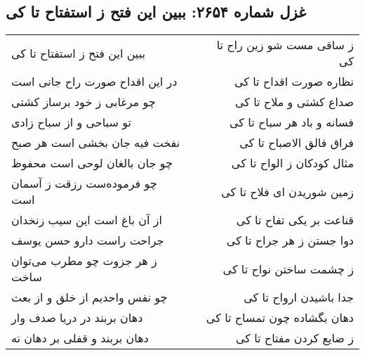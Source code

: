 \begin{center}
\section*{غزل شماره ۲۶۵۴: ببین این فتح ز استفتاح تا کی}
\label{sec:2654}
\begin{longtable}{l p{0.5cm} r}
ببین این فتح ز استفتاح تا کی
&&
ز ساقی مست شو زین راح تا کی
\\
در این اقداح صورت راح جانی است
&&
نظاره صورت اقداح تا کی
\\
چو مرغابی ز خود برساز کشتی
&&
صداع کشتی و ملاح تا کی
\\
تو سباحی و از سباح زادی
&&
فسانه و باد هر سباح تا کی
\\
نفخت فیه جان بخشی است هر صبح
&&
فراق فالق الاصباح تا کی
\\
چو جان بالغان لوحی است محفوظ
&&
مثال کودکان ز الواح تا کی
\\
چو فرموده‌ست رزقت ز آسمان است
&&
زمین شوریدن ای فلاح تا کی
\\
از آن باغ است این سیب زنخدان
&&
قناعت بر یکی تفاح تا کی
\\
جراحت راست دارو حسن یوسف
&&
دوا جستن ز هر جراح تا کی
\\
ز هر جزوت چو مطرب می‌توان ساخت
&&
ز چشمت ساختن نواح تا کی
\\
چو نفس واحدیم از خلق و از بعث
&&
جدا باشیدن ارواح تا کی
\\
دهان بربند در دریا صدف وار
&&
دهان بگشاده چون تمساح تا کی
\\
دهان بربند و قفلی بر دهان نه
&&
ز ضایع کردن مفتاح تا کی
\\
\end{longtable}
\end{center}
